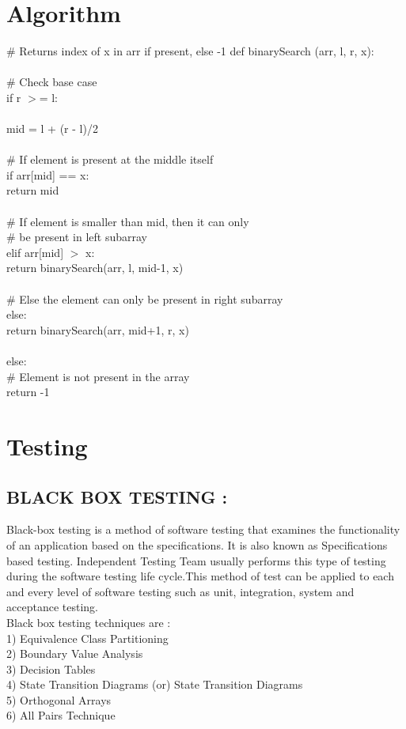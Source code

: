 \documentclass[a4paper,12pt]{article}
\newenvironment{codeblock}{\fontfamily{ccr}\selectfont}{\par}
\begin{document}
\section{Algorithm}
	\begin{codeblock}
	\# Returns index of x in arr if present, else -1
	def binarySearch (arr, l, r, x):\\
	\\
	\# Check base case\\
	if r $>$= l:\\
	\\
	mid = l + (r - l)/2\\
	\\
	\# If element is present at the middle itself\\
	if arr[mid] == x:\\
	return mid\\
	\\
	\# If element is smaller than mid, then it can only\\
	\# be present in left subarray\\
	elif arr[mid] $>$ x:\\
	return binarySearch(arr, l, mid-1, x)\\
	\\
	\# Else the element can only be present in right subarray\\
	else:\\
	return binarySearch(arr, mid+1, r, x)\\
	\\
	else:\\
	\# Element is not present in the array\\
	return -1\\
	\end{codeblock}



\section{Testing}
\subsection{BLACK BOX TESTING : }
		 Black-box testing is a method of software testing that examines the functionality of an application based on the specifications. It is also known as Specifications based testing. Independent Testing Team usually performs this type of testing during the software testing life cycle.This method of test can be applied to each and every level of software testing such as unit, integration, system and acceptance testing.\\
		 Black box testing techniques are :\\
1) Equivalence Class Partitioning\\
2) Boundary Value Analysis\\
3) Decision Tables\\
4) State Transition Diagrams (or) State Transition Diagrams\\
5) Orthogonal Arrays\\
6) All Pairs Technique\\
\end{document}
